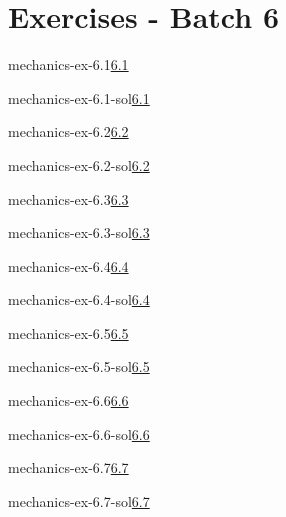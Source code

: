 \documentclass[preview]{standalone}
\begin{document}
\genpage

\section{Exercises - Batch 6}

\begin{snippetexercise}{mechanics-ex-6.1}{\underline{6.1}}
    \todo
\end{snippetexercise}

\begin{snippetsolution}{mechanics-ex-6.1-sol}{\underline{6.1}}
    \todo
\end{snippetsolution}

\begin{snippetexercise}{mechanics-ex-6.2}{\underline{6.2}}
    \todo
\end{snippetexercise}

\begin{snippetsolution}{mechanics-ex-6.2-sol}{\underline{6.2}}
    \todo
\end{snippetsolution}

\begin{snippetexercise}{mechanics-ex-6.3}{\underline{6.3}}
    \todo
\end{snippetexercise}

\begin{snippetsolution}{mechanics-ex-6.3-sol}{\underline{6.3}}
    \todo
\end{snippetsolution}

\begin{snippetexercise}{mechanics-ex-6.4}{\underline{6.4}}
    \todo
\end{snippetexercise}

\begin{snippetsolution}{mechanics-ex-6.4-sol}{\underline{6.4}}
    \todo
\end{snippetsolution}

\begin{snippetexercise}{mechanics-ex-6.5}{\underline{6.5}}
    \todo
\end{snippetexercise}

\begin{snippetsolution}{mechanics-ex-6.5-sol}{\underline{6.5}}
    \todo
\end{snippetsolution}

\begin{snippetexercise}{mechanics-ex-6.6}{\underline{6.6}}
    \todo
\end{snippetexercise}

\begin{snippetsolution}{mechanics-ex-6.6-sol}{\underline{6.6}}
    \todo
\end{snippetsolution}

\begin{snippetexercise}{mechanics-ex-6.7}{\underline{6.7}}
    \todo
\end{snippetexercise}

\begin{snippetsolution}{mechanics-ex-6.7-sol}{\underline{6.7}}
    \todo
\end{snippetsolution}
\end{document}

